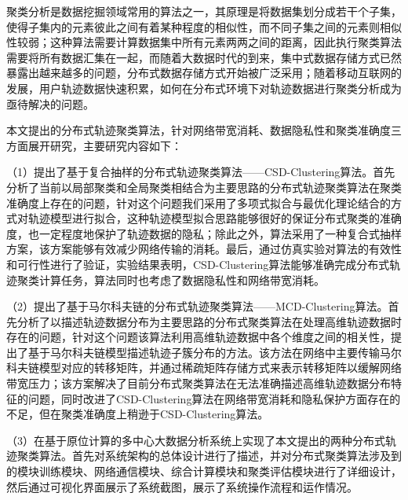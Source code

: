 	
\begin{chineseabstract}
聚类分析是数据挖掘领域常用的算法之一，其原理是将数据集划分成若干个子集，使得子集内的元素彼此之间有着某种程度的相似性，而不同子集之间的元素则相似性较弱；这种算法需要计算数据集中所有元素两两之间的距离，因此执行聚类算法需要将所有数据汇集在一起，而随着大数据时代的到来，集中式数据存储方式已然暴露出越来越多的问题，分布式数据存储方式开始被广泛采用；随着移动互联网的发展，用户轨迹数据快速积累，如何在分布式环境下对轨迹数据进行聚类分析成为亟待解决的问题。

本文提出的分布式轨迹聚类算法，针对网络带宽消耗、数据隐私性和聚类准确度三方面展开研究，主要研究内容如下：

（1）提出了基于复合抽样的分布式轨迹聚类算法——CSD-Clustering算法。首先分析了当前以局部聚类和全局聚类相结合为主要思路的分布式轨迹聚类算法在聚类准确度上存在的问题，针对这个问题我们采用了多项式拟合与最优化理论结合的方式对轨迹模型进行拟合，这种轨迹模型拟合思路能够很好的保证分布式聚类的准确度，也一定程度地保护了轨迹数据的隐私；除此之外，算法采用了一种复合式抽样方案，该方案能够有效减少网络传输的消耗。最后，通过仿真实验对算法的有效性和可行性进行了验证，实验结果表明，CSD-Clustering算法能够准确完成分布式轨迹聚类计算任务，算法同时也考虑了数据隐私性和网络带宽消耗。

（2）提出了基于马尔科夫链的分布式轨迹聚类算法——MCD-Clustering算法。首先分析了以描述轨迹数据分布为主要思路的分布式聚类算法在处理高维轨迹数据时存在的问题，针对这个问题该算法利用高维轨迹数据中各个维度之间的相关性，提出了基于马尔科夫链模型描述轨迹子簇分布的方法。该方法在网络中主要传输马尔科夫链模型对应的转移矩阵，并通过稀疏矩阵存储方式来表示转移矩阵以缓解网络带宽压力；该方案解决了目前分布式聚类算法在无法准确描述高维轨迹数据分布特征的问题，同时改进了CSD-Clustering算法在网络带宽消耗和隐私保护方面存在的不足，但在聚类准确度上稍逊于CSD-Clustering算法。

（3）在基于原位计算的多中心大数据分析系统上实现了本文提出的两种分布式轨迹聚类算法。首先对系统架构的总体设计进行了描述，并对分布式聚类算法涉及到的模块训练模块、网络通信模块、综合计算模块和聚类评估模块进行了详细设计，然后通过可视化界面展示了系统截图，展示了系统操作流程和运作情况。

\end{chineseabstract}